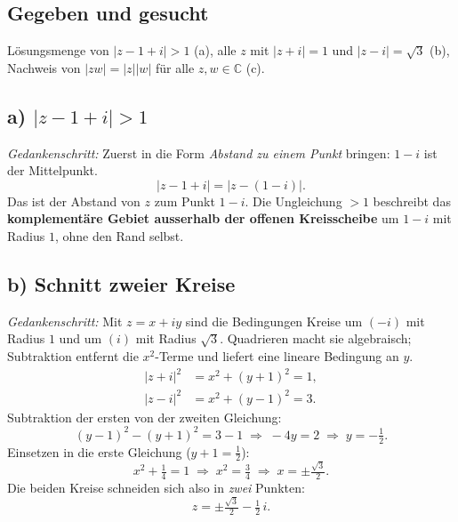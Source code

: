 
\subsection*{Gegeben und gesucht}
Lösungsmenge von $|z-1+i|>1$ (a), alle $z$ mit $|z+i|=1$ und
$|z-i|=\sqrt3$ (b), Nachweis von $|zw|=|z||w|$ für alle $z,w\in\mathbb C$
(c).

\subsection*{a) $|z-1+i|>1$}
\emph{Gedankenschritt:} Zuerst in die Form \emph{Abstand zu einem Punkt}
bringen: $1-i$ ist der Mittelpunkt.
\begin{equation*}
  |z-1+i|=|z-(1-i)| .
\end{equation*}
Das ist der Abstand von $z$ zum Punkt $1-i$. Die Ungleichung $>1$
beschreibt das \textbf{komplementäre Gebiet ausserhalb der offenen
Kreisscheibe} um $1-i$ mit Radius $1$, ohne den Rand selbst.

\subsection*{b) Schnitt zweier Kreise}
\emph{Gedankenschritt:} Mit $z=x+iy$ sind die Bedingungen Kreise um
$(-i)$ mit Radius $1$ und um $(i)$ mit Radius $\sqrt3$. Quadrieren macht
sie algebraisch; Subtraktion entfernt die $x^2$-Terme und liefert eine
lineare Bedingung an $y$.
\begin{align*}
  |z+i|^2&=x^2+(y+1)^2=1,\\
  |z-i|^2&=x^2+(y-1)^2=3 .
\end{align*}
Subtraktion der ersten von der zweiten Gleichung:
\begin{equation*}
  (y-1)^2-(y+1)^2=3-1
  \;\Longrightarrow\;
  -4y=2
  \;\Longrightarrow\;
  y=-\tfrac12 .
\end{equation*}
Einsetzen in die erste Gleichung ($y+1=\tfrac12$):
\begin{equation*}
  x^2+\tfrac14=1 \;\Longrightarrow\;
  x^2=\tfrac34 \;\Longrightarrow\;
  x=\pm\tfrac{\sqrt3}{2} .
\end{equation*}
Die beiden Kreise schneiden sich also in \emph{zwei} Punkten:
\begin{equation*}
  z=\pm\tfrac{\sqrt3}{2}-\tfrac12\,i .
\end{equation*}

